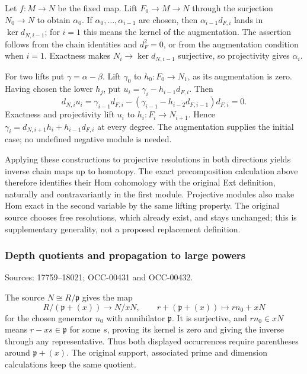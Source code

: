 Let \(f:M\to N\) be the fixed map. Lift \(F_0\to M\to N\) through the surjection \(N_0\to N\) to obtain \(\alpha_0\). If \(\alpha_0,\ldots,\alpha_{i-1}\) are chosen, then \(\alpha_{i-1}d_{F,i}\) lands in \(\ker d_{N,i-1}\); for \(i=1\) this means the kernel of the augmentation. The assertion follows from the chain identities and \(d_F^2=0\), or from the augmentation condition when \(i=1\). Exactness makes \(N_i\to\ker d_{N,i-1}\) surjective, so projectivity gives \(\alpha_i\).

For two lifts put \(\gamma=\alpha-\beta\). Lift \(\gamma_0\) to \(h_0:F_0\to N_1\), as its augmentation is zero. Having chosen the lower \(h_j\), put \(u_i=\gamma_i-h_{i-1}d_{F,i}\). Then \[
d_{N,i}u_i
=\gamma_{i-1}d_{F,i}
-(\gamma_{i-1}-h_{i-2}d_{F,i-1})d_{F,i}=0.
\] Exactness and projectivity lift \(u_i\) to \(h_i:F_i\to N_{i+1}\). Hence \(\gamma_i=d_{N,i+1}h_i+h_{i-1}d_{F,i}\) at every degree. The augmentation supplies the initial case; no undefined negative module is needed.

Applying these constructions to projective resolutions in both directions yields inverse chain maps up to homotopy. The exact precomposition calculation above therefore identifies their Hom cohomology with the original Ext definition, naturally and contravariantly in the first module. Projective modules also make Hom exact in the second variable by the same lifting property. The original source chooses free resolutions, which already exist, and stays unchanged; this is supplementary generality, not a proposed replacement definition.

\subsubsection{Depth quotients and propagation to large powers}\label{algebra-proof-007-depth-quotients-and-propagation-to-large-powers}

Sources: 17759--18021; OCC-00431 and OCC-00432.

The source \(N\cong R/\mathfrak p\) gives the map \[
R/(\mathfrak p+(x))\longrightarrow N/xN,\qquad
r+(\mathfrak p+(x))\longmapsto r n_0+xN
\] for the chosen generator \(n_0\) with annihilator \(\mathfrak p\). It is surjective, and \(rn_0\in xN\) means \(r-xs\in\mathfrak p\) for some \(s\), proving its kernel is zero and giving the inverse through any representative. Thus both displayed occurrences require parentheses around \(\mathfrak p+(x)\). The original support, associated prime and dimension calculations keep the same quotient.


